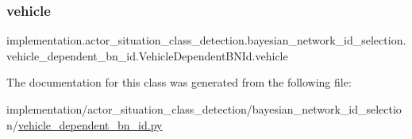 \subsubsection{\texorpdfstring{vehicle}{vehicle}}
{\footnotesize\ttfamily implementation.\+actor\+\_\+situation\+\_\+class\+\_\+detection.\+bayesian\+\_\+network\+\_\+id\+\_\+selection.\+vehicle\+\_\+dependent\+\_\+bn\+\_\+id.\+Vehicle\+Dependent\+B\+N\+Id.\+vehicle}



The documentation for this class was generated from the following file\+:\begin{DoxyCompactItemize}
\item 
implementation/actor\+\_\+situation\+\_\+class\+\_\+detection/bayesian\+\_\+network\+\_\+id\+\_\+selection/\hyperlink{vehicle__dependent__bn__id_8py}{vehicle\+\_\+dependent\+\_\+bn\+\_\+id.\+py}\end{DoxyCompactItemize}

